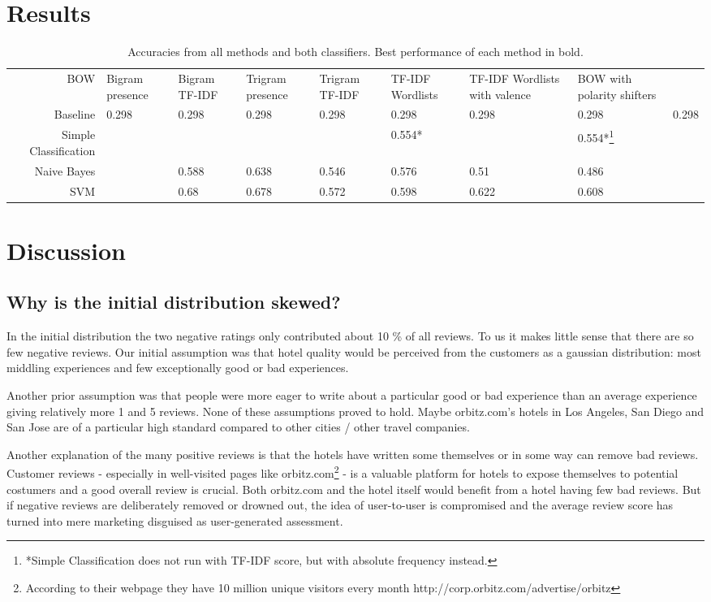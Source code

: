 \documentclass{article}
\begin{document}
\section{Results}
\begin{table}[ht!]
  \centering
  \begin{tabular}{ r | p{3mm} | p{4mm} | p{4mm} | p{4mm} | p{4mm} | p{4mm} | p{4mm} | p{4mm} | }
BOW & Bigram presence & Bigram TF-IDF & Trigram presence & Trigram TF-IDF & TF-IDF Wordlists & TF-IDF Wordlists with valence
&BOW with polarity shifters\\
Baseline&0.298&0.298&0.298&0.298&0.298&0.298&0.298&0.298\\
Simple Classification&&&&&0.554*&&0.554*\footnote{*Simple Classification does not run with TF-IDF score, but with absolute frequency instead.}&\\
Naive Bayes& &0.588&0.638&0.546&0.576&0.51&0.486&\\
SVM&&0.68&0.678&0.572&0.598&0.622&0.608&\\
  \end{tabular}
  \caption{Accuracies from all methods and both classifiers. Best performance of each method in bold. }
  \label{tab:resultsfinal}
\end{table}

\section{Discussion}

\subsection{Why is the initial distribution skewed?}
In the initial distribution the two negative ratings only contributed about 10 \% of all reviews. To us it makes little sense that there are so few negative reviews. Our initial assumption was that hotel quality would be perceived from the customers as a gaussian distribution: most middling experiences and few exceptionally good or bad experiences. 

Another prior assumption was that people were more eager to write about a particular good or bad experience than an average experience giving relatively more 1 and 5 reviews. None of these assumptions proved to hold. Maybe orbitz.com’s hotels in Los Angeles, San Diego and San Jose are of a particular high standard compared to other cities / other travel companies.

Another explanation of the many positive reviews is that the hotels have written some themselves or in some way can remove bad reviews. Customer reviews - especially in well-visited pages like orbitz.com\footnote{According to their webpage they have 10 million unique visitors every month http://corp.orbitz.com/advertise/orbitz} - is a valuable platform for hotels to expose themselves to potential costumers and a good overall review is crucial. Both orbitz.com and the hotel itself would benefit from a hotel having few bad reviews. But if negative reviews are deliberately removed or drowned out, the idea of user-to-user is compromised and the average review score has turned into mere marketing disguised as user-generated assessment. 
\end{document}
